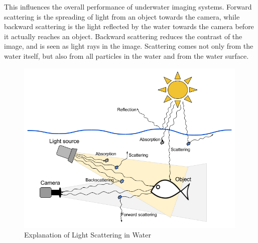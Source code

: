 This influences the overall performance of underwater imaging systems. Forward scattering is the spreading of light from an object towards the camera, while backward scattering is the light reflected by the water towards the camera before it actually reaches an object. Backward scattering reduces the contrast of the image, and is seen as light rays in the image. Scattering comes not only from the water itself, but also from all particles in the water and from the water surface.\cite{article:underwater_image_processing}

\begin{figure}[ht]
    \centering
    \includegraphics[width=0.99\textwidth]{images/literature/light_scattering}
    \caption{Explanation of Light Scattering in Water}
    \label{fig:light_scattering}
\end{figure}

